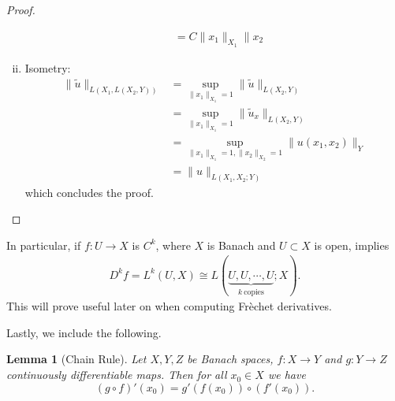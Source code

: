 \documentclass[12pt,reqno]{amsart}
\numberwithin{equation}{section}  %
\newtheorem{lemma}[theorem]{Lemma}
\renewcommand{\cref}{\Cref} %
\begin{document}
\begin{proof}
\begin{enumerate}[i)]
\begin{equation*}
\begin{split}
            & = C\| x_{1} \|_{X_{1}} \| x_{2}
        \end{split}
        \end{equation*}
       \item{}Isometry:
           \begin{equation*}
           \begin{split}
               \| \tilde{u} \|_{L(X_{1}, L(X_{2}, Y))}
               & = \sup_{\| x_{1} \|_{X_{1}} = 1} \| \tilde{u} \|_{L(X_{2}, Y)}
               \\
               & = \sup_{\| x_{1} \|_{X_{1}} = 1} \| \tilde{u}_{x} \|_{L(X_{2},
           Y)}
               \\
               & = \sup_{\| x_{1} \|_{X_{1}} = 1, \| x_{2} \|_{X_{2}} = 1} \|
               u(x_{1}, x_{2}) \|_{Y}
               \\
               & = \| u \|_{L(X_{1}, X_{2}; Y)}
           \end{split}
           \end{equation*}
          which concludes the proof. 
        
    \end{enumerate}
\end{proof}
%
%
\begin{framed}
    In particular, if $f: U \to X$ is $C^{k}$, where $X$ is Banach and $U
    \subset X$ is open, \cref{lem:iso} implies
    \begin{equation*}
    \begin{split}
        D^{k}f = L^{k}(U, X) \cong L(\underbrace{U, U, \cdots, U}_{k \ \text{copies}}; X).
    \end{split}
    \end{equation*}
    This will prove useful later on when computing Fr\`echet derivatives.
\end{framed}
%
Lastly, we include the following.
%
%
\begin{lemma}[Chain Rule]
    Let $X,Y,Z$ be Banach spaces, $f: X \to Y$ and $g: Y \to Z$
    continuously differentiable maps. Then for all $x_0 \in X$ we have
    \begin{equation*} (g \circ f)' (x_0) = g'(f(x_0)) \circ (f'(x_0)).
		\end{equation*} 
	\end{lemma}
\end{document}
